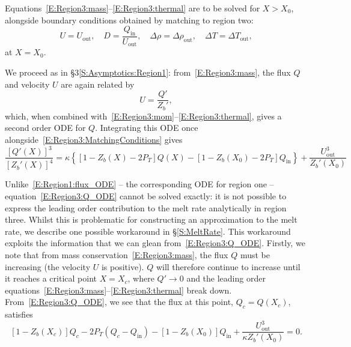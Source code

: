 \documentclass[openacc]{rsproca_new}%
\newcommand{\Pt}{\textit{P}_T}
\renewcommand{\in}{\text{in}} %
\newcommand{\out}{\text{out}}
\begin{document}
Equations~\eqref{E:Region3:mass}--\eqref{E:Region3:thermal} are to be solved for $X > X_0$, alongside boundary conditions obtained by matching to region two:
\begin{equation}\label{E:Region3:MatchingConditions}
U = U_\out, \quad D = \frac{Q_\in}{U_\out}, \quad \Delta \rho = \Delta \rho_\out, \quad \Delta T = \Delta T_\out,
\end{equation}
at $X = X_0$. 

We proceed as in \S3\ref{S:Asymptotics:Region1}: from~\eqref{E:Region3:mass}, the flux $Q$ and velocity $U$ are again related by
\begin{equation}\label{E:Region3:U_Q_relation}
U = \frac{Q'}{Z_b'},
\end{equation}
which, when combined with~\eqref{E:Region3:mom}--\eqref{E:Region3:thermal}, gives a second order ODE for $Q$. Integrating this ODE once alongside~\eqref{E:Region3:MatchingConditions} gives
\begin{equation}\label{E:Region3:Q_ODE}
\frac{\left[Q'(X)\right]^3}{\left[Z_b'(X)\right]^4} = \kappa \left\{ \left[1 - Z_b(X) - 2P_T\right] Q(X) - \left[1 - Z_b(X_0) - 2P_T\right]Q_\text{in}\right\} + \frac{U_\text{out}^3}{Z_b'(X_0)}
\end{equation}

Unlike~\eqref{E:Region1:flux_ODE} -- the corresponding ODE for region one -- equation~\eqref{E:Region3:Q_ODE} cannot be solved exactly: it is not possible to express the leading order contribution to the melt rate analytically in region three. Whilst this is problematic for constructing an approximation to the melt rate, we describe one possible workaround in \S\ref{S:MeltRate}. This workaround exploits the information that we can glean from~\eqref{E:Region3:Q_ODE}. Firstly, we note that from mass conservation~\eqref{E:Region3:mass}, the flux $Q$ must be increasing (the velocity $U$ is positive). $Q$ will therefore continue to increase until it reaches a critical point $X = X_c$, where $Q' \to 0$ and the leading order equations~\eqref{E:Region3:mass}--\eqref{E:Region3:thermal} break down. From~\eqref{E:Region3:Q_ODE}, we see that the flux at this point, $Q_c =Q(X_c)$, satisfies 
\begin{equation}
\left[1 - Z_b(X_c)\right]Q_c - 2\Pt\left(Q_c - Q_\in\right) -\left[1 - Z_b(X_0)\right]Q_\in +  \frac{U_\out^3}{\kappa Z_b'(X_0)} = 0.
\end{equation}
\end{document}
